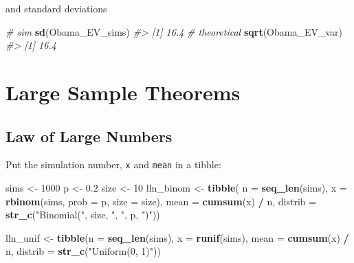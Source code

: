 \documentclass[]{book}
\newenvironment{Shaded}{\begin{snugshade}}{\end{snugshade}}
\newcommand{\KeywordTok}[1]{\textcolor[rgb]{0.13,0.29,0.53}{\textbf{#1}}}
\newcommand{\DataTypeTok}[1]{\textcolor[rgb]{0.13,0.29,0.53}{#1}}
\newcommand{\DecValTok}[1]{\textcolor[rgb]{0.00,0.00,0.81}{#1}}
\newcommand{\FloatTok}[1]{\textcolor[rgb]{0.00,0.00,0.81}{#1}}
\newcommand{\StringTok}[1]{\textcolor[rgb]{0.31,0.60,0.02}{#1}}
\newcommand{\CommentTok}[1]{\textcolor[rgb]{0.56,0.35,0.01}{\textit{#1}}}
\newcommand{\OperatorTok}[1]{\textcolor[rgb]{0.81,0.36,0.00}{\textbf{#1}}}
\newcommand{\NormalTok}[1]{#1}
\theoremstyle{definition}
\theoremstyle{definition}
\theoremstyle{definition}
\theoremstyle{remark}
\begin{document}
and standard deviations

\begin{Shaded}
\begin{Highlighting}[]
\CommentTok{# sim}
\KeywordTok{sd}\NormalTok{(Obama_EV_sims)}
\CommentTok{#> [1] 16.4}
\CommentTok{# theoretical}
\KeywordTok{sqrt}\NormalTok{(Obama_EV_var)}
\CommentTok{#> [1] 16.4}
\end{Highlighting}
\end{Shaded}

\section{Large Sample Theorems}\label{large-sample-theorems}

\subsection{Law of Large Numbers}\label{law-of-large-numbers}

Put the simulation number, \texttt{x} and \texttt{mean} in a tibble:

\begin{Shaded}
\begin{Highlighting}[]
\NormalTok{sims <-}\StringTok{ }\DecValTok{1000}
\NormalTok{p <-}\StringTok{ }\FloatTok{0.2}
\NormalTok{size <-}\StringTok{ }\DecValTok{10}
\NormalTok{lln_binom <-}\StringTok{ }\KeywordTok{tibble}\NormalTok{(}
  \DataTypeTok{n =} \KeywordTok{seq_len}\NormalTok{(sims),}
  \DataTypeTok{x =} \KeywordTok{rbinom}\NormalTok{(sims, }\DataTypeTok{prob =}\NormalTok{ p, }\DataTypeTok{size =}\NormalTok{ size),}
  \DataTypeTok{mean =} \KeywordTok{cumsum}\NormalTok{(x) }\OperatorTok{/}\StringTok{ }\NormalTok{n,}
  \DataTypeTok{distrib =} \KeywordTok{str_c}\NormalTok{(}\StringTok{"Binomial("}\NormalTok{, size, }\StringTok{", "}\NormalTok{, p, }\StringTok{")"}\NormalTok{))}
\end{Highlighting}
\end{Shaded}

\begin{Shaded}
\begin{Highlighting}[]
\NormalTok{lln_unif <-}
\StringTok{ }\KeywordTok{tibble}\NormalTok{(}\DataTypeTok{n =} \KeywordTok{seq_len}\NormalTok{(sims),}
        \DataTypeTok{x =} \KeywordTok{runif}\NormalTok{(sims),}
        \DataTypeTok{mean =} \KeywordTok{cumsum}\NormalTok{(x) }\OperatorTok{/}\StringTok{ }\NormalTok{n,}
        \DataTypeTok{distrib =} \KeywordTok{str_c}\NormalTok{(}\StringTok{"Uniform(0, 1)"}\NormalTok{))}
\end{Highlighting}
\end{Shaded}
\end{document}

